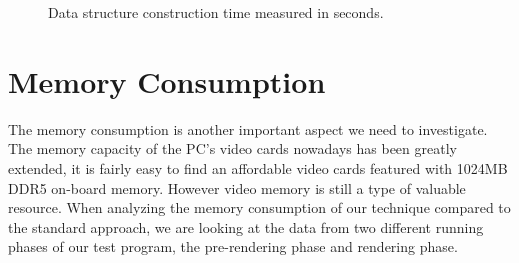 \begin{figure}[tp]
    \centering
    \renewcommand{\thefigure}{\thechapter.\arabic{figure}}
    \caption[Data construction time performance]{Data structure construction time measured in seconds. }
    \label{fig:construction_time}
\end{figure}


\section{Memory Consumption}

The memory consumption is another important aspect we need to investigate. The memory capacity of the PC's video cards nowadays has been greatly extended, it is fairly easy to find an affordable video cards featured with 1024MB DDR5 on-board memory. However video memory is still a type of valuable resource. When analyzing the memory consumption of our technique compared to the standard approach, we are looking at the data from two different running phases of our test program, the pre-rendering phase and rendering phase.

